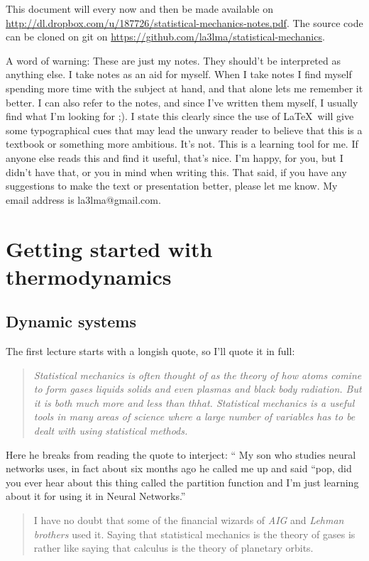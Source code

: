 \documentclass[a4, 12pt, english, USenglish]{scrreprt}
\newcommand{\idx}[1]{{\em #1}\index{#1}}
\begin{document}
This document will every now and then be made available on
\url{http://dl.dropbox.com/u/187726/statistical-mechanics-notes.pdf}.   The
source code can be cloned on git on \url{https://github.com/la3lma/statistical-mechanics}.


A word of warning: These are just my notes.  They should't be
interpreted as anything else.  I take notes as an aid for myself.
When I take notes I find myself spending more time with the subject at
hand, and that alone lets me remember it better.  I can also refer to
the notes, and since I've written them myself, I usually find  what
I'm looking for ;).   I state this clearly since the use of \LaTeX\ will
give some typographical cues that may lead the unwary reader to
believe that this is a textbook or something more ambitious.  It's
not.  This is a learning tool for me.  If anyone else reads this and
find it useful, that's nice. I'm happy,  for you, but I didn't have
that, or you in mind when writing this.   That said, if you have any
suggestions to make the text or presentation better, please let me
know.  My email address is la3lma@gmail.com.

\chapter{Getting started with thermodynamics}


\section{Dynamic systems}

The first lecture starts with a longish quote, so I'll quote it in
full:

\begin{quote}\it
Statistical mechanics is often thought of as the theory of how atoms
comine to form gases liquids solids and even plasmas and black body
radiation.   But it is both much more and less than thhat.
Statistical mechanics is a useful tools in many areas of science where
a large number of variables has to be dealt with using statistical
methods.
\end{quote}


Here he breaks from reading the quote to interject: `` My son who
studies neural networks uses, in fact about six months ago he called
me up and said ``pop, did you ever hear about this thing called the
partition function and I'm just learning about it for using it in
Neural Networks.''

\begin{quote} \it

I have no doubt that some of the financial wizards of \idx{AIG} and \idx{Lehman
brothers} used it.  Saying that statistical mechanics is the theory of
gases is rather like saying that calculus is the theory of planetary orbits.

\end{quote}
\end{document}
